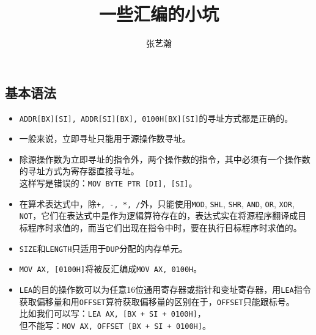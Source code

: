 \documentclass{article}
\begin{document}
\begin{CJK*}{UTF8}{gbsn}

\title{一些汇编的小坑}
\author{张艺瀚}
\date{}
\maketitle

\section{基本语法}

\begin{itemize}

\item
\verb|ADDR[BX][SI], ADDR[SI][BX], 0100H[BX][SI]|的寻址方式都是正确的。 \\

\item
一般来说，立即寻址只能用于源操作数寻址。 \\

\item
除源操作数为立即寻址的指令外，两个操作数的指令，其中必须有一个操作数的寻址方式为寄存器直接寻址。 \\
这样写是错误的：\verb|MOV BYTE PTR [DI], [SI]|。 \\

\item
在算术表达式中，除\verb|+, -, *, /|外，只能使用\verb|MOD|, \verb|SHL|, \verb|SHR|, \verb|AND|, \verb|OR|, \verb|XOR|, \verb|NOT|，它们在表达式中是作为逻辑算符存在的，表达式实在将源程序翻译成目标程序时求值的，而当它们出现在指令中时，要在执行目标程序时求值的。 \\

\item
\verb|SIZE|和\verb|LENGTH|只适用于\verb|DUP|分配的内存单元。 \\

\item
\verb|MOV AX, [0100H]|将被反汇编成\verb|MOV AX, 0100H|。 \\

\item
\verb|LEA|的目的操作数可以为任意16位通用寄存器或指针和变址寄存器，用\verb|LEA|指令获取偏移量和用\verb|OFFSET|算符获取偏移量的区别在于，\verb|OFFSET|只能跟标号。 \\
比如我们可以写：\verb|LEA AX, [BX + SI + 0100H]|， \\
但不能写：\verb|MOV AX, OFFSET [BX + SI + 0100H]|。 \\


\end{itemize}
\end{CJK*}
\end{document}
